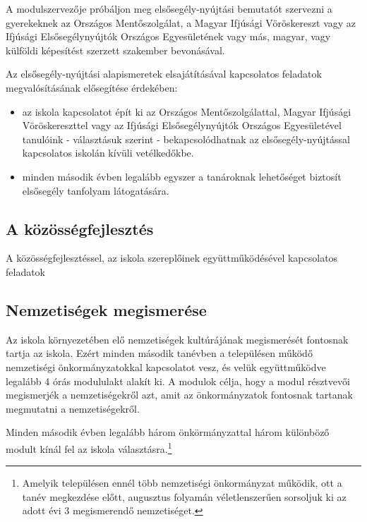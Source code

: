 A modulszervezője próbáljon meg elsősegély-nyújtási bemutatót szervezni a
gyerekeknek az Országos Mentőszolgálat, a Magyar Ifjúsági Vöröskereszt vagy az
Ifjúsági Elsősegélynyújtók Országos Egyesületének vagy más, magyar, vagy
külföldi képesítést szerzett szakember bevonásával.

Az elsősegély-nyújtási alapismeretek elsajátításával kapcsolatos feladatok
megvalósításának elősegítése érdekében:
\begin{itemize}
      \item az iskola kapcsolatot épít ki az Országos Mentőszolgálattal, Magyar
            Ifjúsági
            Vöröskereszttel vagy az Ifjúsági Elsősegélynyújtók Országos
            Egyesületével
            tanulóink - választásuk szerint - bekapcsolódhatnak az
            elsősegély-nyújtással
            kapcsolatos iskolán kívüli vetélkedőkbe.
      \item  minden második évben legalább egyszer a tanároknak lehetőséget
            biztosít
            elsősegély tanfolyam látogatására.

\end{itemize}

\subsection{A
      közösségfejlesztés}

A közösségfejlesztéssel, az iskola szereplőinek együttműködésével
kapcsolatos feladatok


\subsection{Nemzetiségek
      megismerése}\label{sec:nemzetiseg}

Az iskola környezetében elő nemzetiségek kultúrájának megismerését fontosnak
tartja az iskola.
Ezért minden második tanévben a településen működő nemzetiségi
önkormányzatokkal
kapcsolatot vesz, és  velük együttműködve legalább 4 órás
modululakt alakít ki. A modulok célja, hogy a modul résztvevői megismerjék a
nemzetiségekről azt, amit az önkormányzatok fontosnak tartanak megmutatni a
nemzetiségekről.

Minden második évben legalább három önkörmányzattal három különböző modult
kínál fel az iskola választásra.\footnote{Amelyik településen ennél több
      nemzetiségi önkormányzat működik, ott a tanév
      megkezdése előtt, augusztus folyamán véletlenszerűen sorsoljuk ki az
      adott évi
      3 megismerendő nemzetiséget.}

